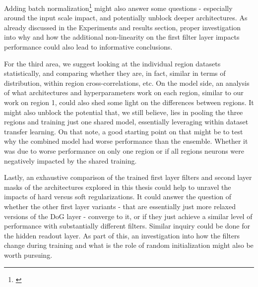 Adding batch normalization\footnote{\citep{2015arXiv150203167I}} might also answer some questions - especially around the input scale impact, and potentially unblock deeper architectures. As already discussed in the Experiments and results section, proper investigation into why and how the additional non-linearity on the first filter layer impacts performance could also lead to informative conclusions.

For the third area, we suggest looking at the individual region datasets statistically, and comparing whether they are, in fact, similar in terms of distribution, within region cross-correlations, etc. On the model side, an analysis of what architectures and hyperparameters work on each region, similar to our work on region 1, could also shed some light on the differences between regions. It might also unblock the potential that, we still believe, lies in pooling the three regions and training just one shared model, essentially leveraging within dataset transfer learning. On that note, a good starting point on that might be to test why the combined model had worse performance than the ensemble. Whether it was due to worse performance on only one region or if all regions neurons were negatively impacted by the shared training.

Lastly, an exhaustive comparison of the trained first layer filters and second layer masks of the architectures explored in this thesis could help to unravel the impacts of hard versus soft regularizations. It could answer the question of whether the other first layer variants - that are essentially just more relaxed versions of the DoG layer - converge to it, or if they just achieve a similar level of performance with substantially different filters. Similar inquiry could be done for the hidden readout layer. As part of this, an investigation into how the filters change during training and what is the role of random initialization might also be worth pursuing.
